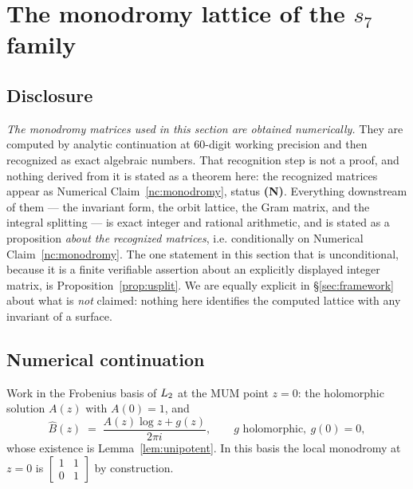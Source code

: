 \section{The monodromy lattice of the \texorpdfstring{$s_7$}{s7} family}
\label{sec:lattice}

\subsection*{Disclosure}

\emph{The monodromy matrices used in this section are obtained numerically.}
They are computed by analytic continuation at 60-digit working precision and
then recognized as exact algebraic numbers. That recognition step is not a
proof, and nothing derived from it is stated as a theorem here: the recognized
matrices appear as Numerical Claim~\ref{nc:monodromy}, status \textbf{(N)}.
Everything downstream of them --- the invariant form, the orbit lattice, the
Gram matrix, and the integral splitting --- is exact integer and rational
arithmetic, and is stated as a proposition \emph{about the recognized
matrices}, i.e. conditionally on Numerical Claim~\ref{nc:monodromy}. The one
statement in this section that is unconditional, because it is a finite
verifiable assertion about an explicitly displayed integer matrix, is
Proposition~\ref{prop:usplit}. We are equally explicit in
\S\ref{sec:framework} about what is \emph{not} claimed: nothing here
identifies the computed lattice with any invariant of a surface.

\subsection{Numerical continuation}

Work in the Frobenius basis of $L_2$ at the MUM point $z=0$: the
holomorphic solution $A(z)$ with $A(0)=1$, and
\[
  \widehat{B}(z) \;=\; \frac{A(z)\log z + g(z)}{2\pi i},
  \qquad g \text{ holomorphic},\ g(0)=0,
\]
whose existence is Lemma~\ref{lem:unipotent}. In this basis the local
monodromy at $z=0$ is $\left[\begin{smallmatrix}1&1\\0&1\end{smallmatrix}\right]$
by construction.

